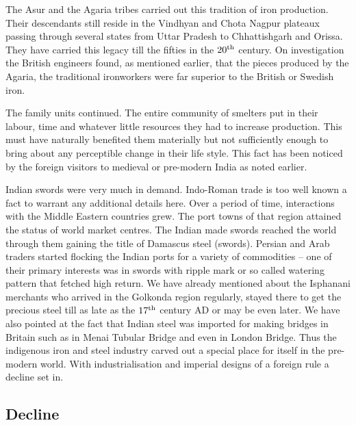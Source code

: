 The Asur and the Agaria tribes carried out this tradition of iron production. Their descendants still reside in the Vindhyan and Chota Nagpur plateaux passing through several states from Uttar Pradesh to Chhattishgarh and Orissa. They have carried this legacy till the fifties in the $20^{\rm th}$ century. On investigation the British engineers found, as mentioned earlier, that the pieces produced by the Agaria, the traditional ironworkers were far superior to the British or Swedish iron.

The family units continued. The entire community of smelters put in their labour, time and whatever little resources they had to increase production. This must have naturally benefited them materially but not sufficiently enough to bring about any perceptible change in their life style. This fact has been noticed by the foreign visitors to medieval or pre-modern India as noted earlier.

Indian swords were very much in demand. Indo-Roman trade is too well known a fact to warrant any additional details here. Over a period of time, interactions with the Middle Eastern countries grew. The port towns of that region attained the status of world market centres. The Indian made swords reached the world through them gaining the title of Damascus steel (swords). Persian and Arab traders started flocking the Indian ports for a variety of commodities – one of their primary interests was in swords with ripple mark or so called watering pattern that fetched high return. We have already mentioned about the Isphanani merchants who arrived in the Golkonda region regularly, stayed there to get the precious steel till as late as the $17^{\rm th}$ century AD or may be even later. We have also pointed at the fact that Indian steel was imported for making bridges in Britain such as in Menai Tubular Bridge and even in London Bridge. Thus the indigenous iron and steel industry carved out a special place for itself in the pre-modern world. With industrialisation and imperial designs of a foreign rule a decline set in.  

\vspace{-.3cm}

\subsection*{Decline}\label{chapter8-subsection-8}

\vspace{-.2cm}

